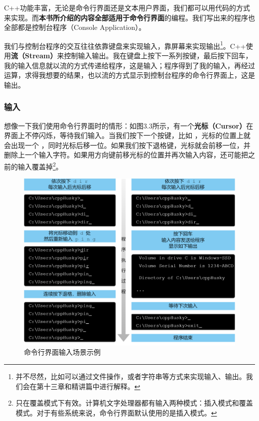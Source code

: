 C++功能丰富，无论是命令行界面还是文本用户界面，我们都可以用代码的方式来实现。而\textbf{本书所介绍的内容全部适用于命令行界面}的编程。我们写出来的程序也全部都是控制台程序（Console Application）。\par
我们与控制台程序的交互往往依靠键盘来实现输入，靠屏幕来实现输出\footnote{并不尽然，比如可以通过文件操作，或者字符串等方式来实现输入、输出。我们会在第十三章和精讲篇中进行解释。}。C++使用\textbf{流（Stream）}来控制输入输出。我在键盘上按下一系列按键，最后按下回车，我的输入信息就以流的方式传递给程序，这是输入；程序得到了我的输入，再经过运算，求得我想要的结果，也以流的方式显示到控制台程序的命令行界面上，这是输出。\par
\subsubsection*{输入}
想像一下我们使用命令行界面时的情形：如图3.3所示，有一个\textbf{光标（Cursor）}在界面上不停闪烁，等待我们输入。当我们按下一个按键，比如 \lstinline@d@，光标的位置上就会出现一个 \lstinline@d@，同时光标后移一位。如果我们按下退格键，光标就会前移一位，并删除上一个输入字符。如果用方向键前移光标的位置并再次输入内容，还可能把之前的输入覆盖掉\footnote{只在覆盖模式下有效。计算机文字处理器都有输入两种模式：插入模式和覆盖模式。对于有些系统来说，命令行界面默认使用的是插入模式。}。\par
\begin{figure}[htbp]
    \centering
    \includegraphics[width=\textwidth]{../images/generalized_parts/03_input_to_cmd.drawio.png}
    \caption{命令行界面输入场景示例}
\end{figure}
